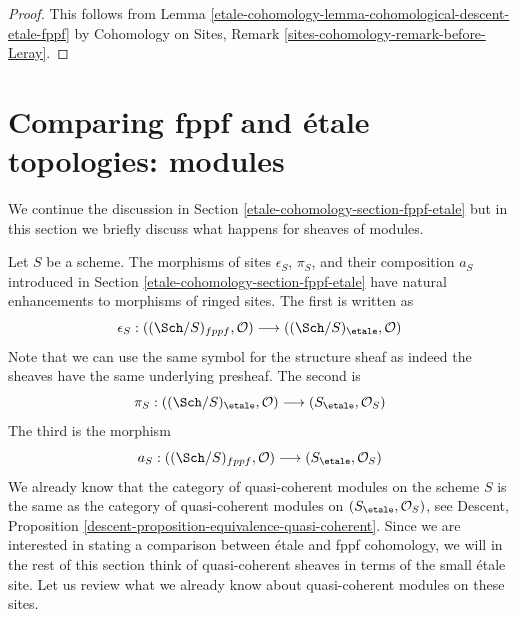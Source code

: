 \begin{proof}
This follows from Lemma \ref{etale-cohomology-lemma-cohomological-descent-etale-fppf}
by Cohomology on Sites, Remark \ref{sites-cohomology-remark-before-Leray}.
\end{proof}

\section{Comparing fppf and \'etale topologies: modules}
\label{etale-cohomology-section-fppf-etale-modules}
We continue the discussion in Section \ref{etale-cohomology-section-fppf-etale} but in this
section we briefly discuss what happens for sheaves of modules.

\medskip\noindent
Let $S$ be a scheme. The morphisms of sites $\epsilon_S$, $\pi_S$, and
their composition $a_S$ introduced in Section \ref{etale-cohomology-section-fppf-etale}
have natural enhancements to morphisms of ringed sites. The first
is written as
$$
\epsilon_S :
((\Sch/S)_{fppf}, \mathcal{O})
\longrightarrow
((\Sch/S)_\etale, \mathcal{O})
$$
Note that we can use the same symbol for the structure sheaf as indeed
the sheaves have the same underlying presheaf. The second is
$$
\pi_S :
((\Sch/S)_\etale, \mathcal{O})
\longrightarrow
(S_\etale, \mathcal{O}_S)
$$
The third is the morphism
$$
a_S :
((\Sch/S)_{fppf}, \mathcal{O})
\longrightarrow
(S_\etale, \mathcal{O}_S)
$$
We already know that the category of quasi-coherent modules on the
scheme $S$ is the same as the category of quasi-coherent modules
on $(S_\etale, \mathcal{O}_S)$, see
Descent, Proposition \ref{descent-proposition-equivalence-quasi-coherent}.
Since we are interested in stating a comparison between
\'etale and fppf cohomology, we will in the rest of this
section think of quasi-coherent sheaves in terms of the
small \'etale site.
Let us review what we already know about quasi-coherent
modules on these sites.

